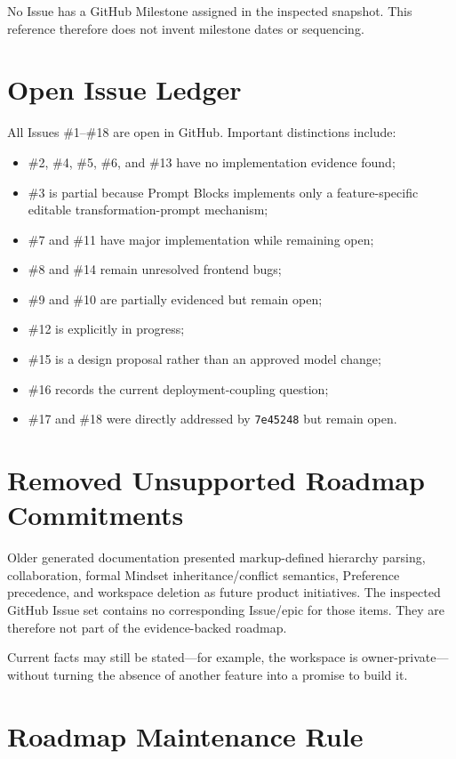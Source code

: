 \documentclass[11pt]{article}
\newcommand{\commit}[1]{\texttt{#1}}
\begin{document}
No Issue has a GitHub Milestone assigned in the inspected snapshot. This reference
therefore does not invent milestone dates or sequencing.

\section{Open Issue Ledger}

All Issues \#1--\#18 are open in GitHub. Important distinctions include:

\begin{itemize}
  \item \#2, \#4, \#5, \#6, and \#13 have no implementation evidence found;
  \item \#3 is partial because Prompt Blocks implements only a feature-specific
        editable transformation-prompt mechanism;
  \item \#7 and \#11 have major implementation while remaining open;
  \item \#8 and \#14 remain unresolved frontend bugs;
  \item \#9 and \#10 are partially evidenced but remain open;
  \item \#12 is explicitly in progress;
  \item \#15 is a design proposal rather than an approved model change;
  \item \#16 records the current deployment-coupling question;
  \item \#17 and \#18 were directly addressed by \commit{7e45248} but remain open.
\end{itemize}

\section{Removed Unsupported Roadmap Commitments}

Older generated documentation presented markup-defined hierarchy parsing,
collaboration, formal Mindset inheritance/conflict semantics, Preference precedence,
and workspace deletion as future product initiatives. The inspected GitHub Issue
set contains no corresponding Issue/epic for those items. They are therefore not
part of the evidence-backed roadmap.

Current facts may still be stated---for example, the workspace is owner-private---
without turning the absence of another feature into a promise to build it.

\section{Roadmap Maintenance Rule}
\end{document}

